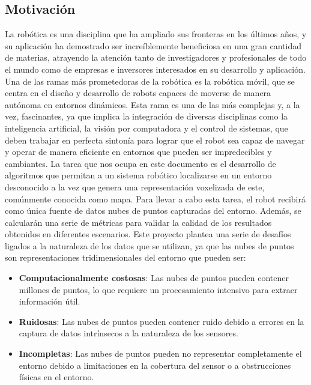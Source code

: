\documentclass[12pt, a4paper, twoside]{article}
\begin{document}
\subsection{Motivación}
La robótica es una disciplina que ha ampliado sus fronteras en los últimos años, y su aplicación ha demostrado ser 
increíblemente beneficiosa en una gran cantidad de materias, atrayendo la atención tanto de investigadores y profesionales de todo el 
mundo como de empresas e inversores interesados en su desarrollo y aplicación. \newline
Una de las ramas más prometedoras de la robótica es la robótica móvil, que se centra en el diseño y desarrollo de robots capaces 
de moverse de manera autónoma en entornos dinámicos. Esta rama es una de las más complejas y, a la vez, fascinantes, ya que implica 
la integración de diversas disciplinas como la inteligencia artificial, la visión por computadora y el control de sistemas, que 
deben trabajar en perfecta sintonía para lograr que el robot sea capaz de navegar y operar de manera eficiente en entornos que 
pueden ser impredecibles y cambiantes. \newline
La tarea que nos ocupa en este documento es el desarrollo de algoritmos que permitan a un sistema robótico localizarse en un entorno 
desconocido a la vez que genera una representación voxelizada de este, comúnmente conocida como mapa. Para llevar a cabo esta tarea, 
el robot recibirá como única fuente de datos nubes de puntos capturadas del entorno. Además, se calcularán una serie de métricas para 
validar la calidad de los resultados obtenidos en diferentes escenarios.\newline
Este proyecto plantea una serie de desafíos ligados a la naturaleza de los datos que se utilizan, ya que las nubes de puntos son 
representaciones tridimensionales del entorno que pueden ser:  
\begin{itemize}
  \item  \textbf{Computacionalmente costosas}: 
    Las nubes de puntos pueden contener millones de puntos, lo que requiere un procesamiento intensivo para extraer información útil.
  \item  \textbf{Ruidosas}:
    Las nubes de puntos pueden contener ruido debido a errores en la captura de datos intrínsecos a la naturaleza de los sensores.
  \item  \textbf{Incompletas}:
    Las nubes de puntos pueden no representar completamente el entorno debido a limitaciones en la cobertura del sensor o a 
    obstrucciones físicas en el entorno.
\end{itemize}
\end{document}
